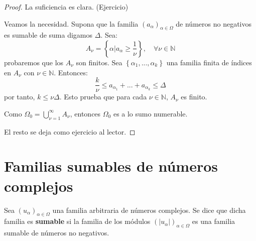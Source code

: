 \documentclass[12pt]{report}
\theoremstyle{largebreak}
\newcommand\abs[1]{\ensuremath{\big|#1\big|}}
\begin{document}
    \begin{proof}
        La suficiencia es clara. (Ejercicio) %

        Veamos la necesidad. Supona que la familia $(a_\alpha)_{\alpha\in\Omega}$ de números no negativos es sumable de suma digamos $\Delta$. Sea:
        \begin{equation*}
            A_\nu=\left\{\alpha\Big|a_\alpha\geq\frac{1}{\nu} \right\},\quad\forall\nu\in\mathbb{N}
        \end{equation*}
        probaremos que los $A_\nu$ son finitos. Sea $\left\{\alpha_1,...,\alpha_k\right\}$ una familia finita de índices en $A_\nu$ con $\nu\in\mathbb{N}$. Entonces:
        \begin{equation*}
            \frac{k}{\nu}\leq a_{\alpha_1}+...+a_{\alpha_k}\leq\Delta
        \end{equation*}
        por tanto, $k\leq \nu\Delta$. Esto prueba que para cada $\nu\in\mathbb{N}$, $A_\nu$ es finito.

        Como $\Omega_0=\bigcup_{\nu=1 }^\infty A_\nu$, entonces $\Omega_0$ es a lo sumo numerable.

        El resto se deja como ejercicio al lector.
    \end{proof}

    \section{Familias sumables de números complejos}

    \begin{mydef}
        Sea $\left(u_\alpha \right)_{\alpha\in\Omega}$ una familia arbitraria de números complejos. Se dice que dicha familia es \textbf{sumable} si la familia de los módulos $\left(\abs{u_\alpha } \right)_{\alpha\in\Omega}$ es una familia sumable de números no negativos.
    \end{mydef}
\end{document}
